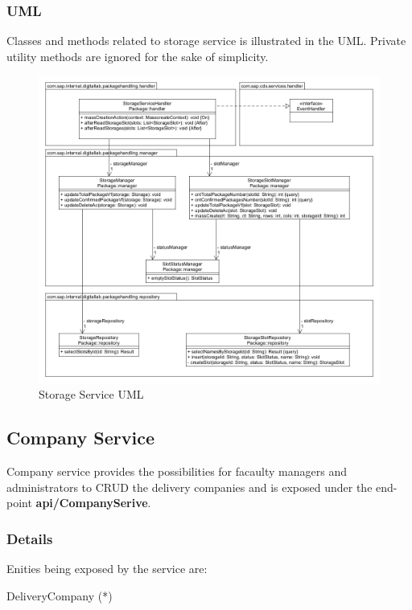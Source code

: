 \subsubsection{UML}

Classes and methods related to storage service is illustrated in the UML. Private utility methods are ignored for the sake of simplicity.
\begin{figure}[!h]
    \centering
    \includegraphics[width=1\linewidth]{images/service_class_diagrams/storage_service_class_diagram.png}
    \caption{Storage Service UML}
    \label{fig:storage_service_uml}
\end{figure}
\pagebreak

\subsection{Company Service}
Company service provides the possibilities for facaulty managers and administrators to CRUD the delivery companies and is exposed under the end-point \textbf{api/CompanySerive}.

\subsubsection{Details}

Enities being exposed by the service are:
\begin{compactenum}
	\item DeliveryCompany (*)
\end{compactenum}

